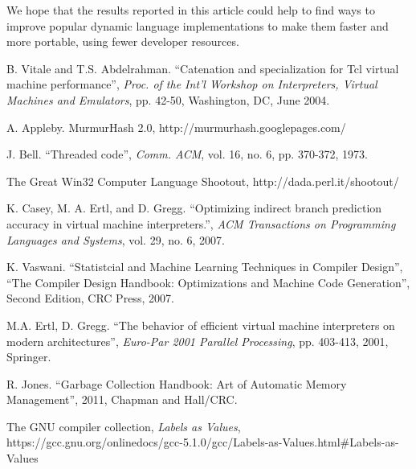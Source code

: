 \documentclass[preprint]{sigplanconf}
\begin{document}
  We hope that the results reported in this article could
help to find ways to improve popular dynamic language implementations
to make them faster and more portable, using fewer developer resources.






\begin{thebibliography}{}
\softraggedright

B. Vitale and T.S. Abdelrahman. ``Catenation and specialization for
Tcl virtual machine performance'', \emph{Proc. of the Int'l Workshop on
Interpreters, Virtual Machines and Emulators}, pp. 42-50, Washington,
DC, June 2004.

A. Appleby. MurmurHash 2.0,
http://murmurhash.googlepages.com/

  J. Bell. ``Threaded code'', \emph{Comm. ACM}, vol. 16, no. 6,
  pp. 370-372, 1973.

  The Great Win32 Computer Language Shootout,
  http://dada.perl.it/shootout/
  
  K. Casey, M. A. Ertl, and D. Gregg. ``Optimizing indirect
  branch prediction accuracy in virtual machine interpreters.'',
  \emph{ACM Transactions on Programming Languages and Systems},
  vol. 29, no. 6, 2007.

  K. Vaswani. ``Statistcial and Machine Learning Techniques in Compiler Design'',
  ``The Compiler Design Handbook: Optimizations and Machine Code Generation'',
   Second Edition, CRC Press, 2007.
  
M.A. Ertl, D. Gregg. ``The behavior of efficient virtual machine
interpreters on modern architectures'', \emph{Euro-Par 2001 Parallel
  Processing},  pp. 403-413, 2001, Springer.

R. Jones. ``Garbage Collection Handbook: Art of Automatic Memory Management'',
2011, Chapman and Hall/CRC.

 The GNU compiler collection, \emph{Labels as Values},
https://gcc.gnu.org/onlinedocs/gcc-5.1.0/gcc/Labels-as-Values.html\#Labels-as-Values
  

\end{thebibliography}
\end{document}
